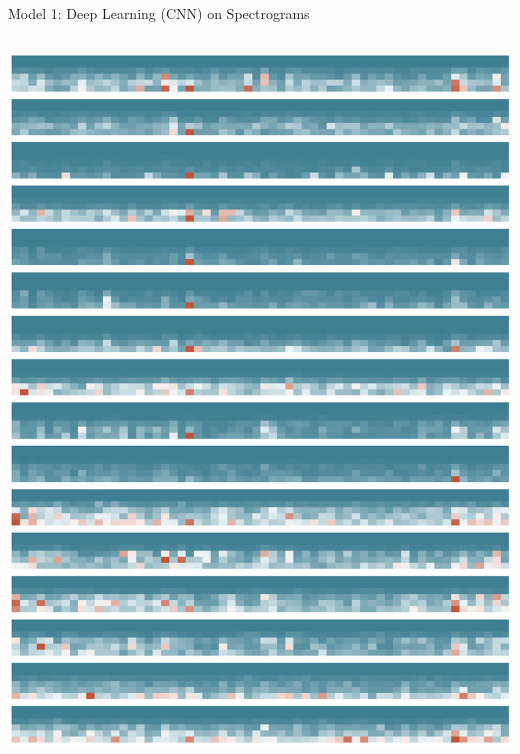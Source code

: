 \documentclass{beamer}
\begin{document}
\begin{frame}{Model 1: Deep Learning (CNN) on Spectrograms}
\begin{columns}
    \includegraphics[scale=0.22]{img/sample_p_spec.eps}
  \end{columns}

\end{frame}
\end{document}
